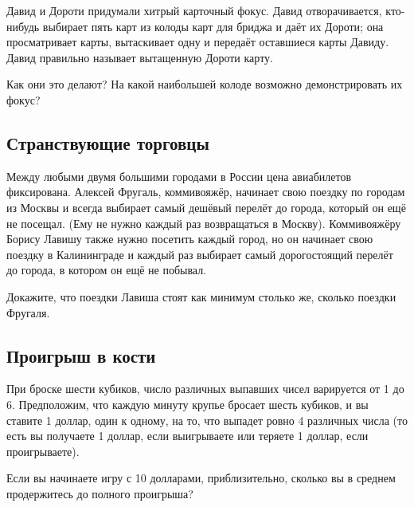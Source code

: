 Давид и Дороти придумали хитрый карточный фокус.
Давид отворачивается, кто-нибудь выбирает пять карт из колоды карт для бриджа и даёт их Дороти; она просматривает карты, вытаскивает одну и передаёт оставшиеся карты Давиду.
Давид правильно называет вытащенную Дороти карту.

Как они это делают?
На какой наибольшей колоде возможно демонстрировать их фокус?

\subsection*{Странствующие торговцы}%

Между любыми двумя большими городами в России цена авиабилетов фиксирована.
Алексей Фругаль, коммивояжёр, начинает свою поездку по городам из Москвы и всегда выбирает самый дешёвый перелёт до города, который он ещё не посещал.
(Ему не нужно каждый раз возвращаться в Москву).
Коммивояжёру Борису Лавишу также нужно посетить каждый город, но он начинает свою поездку в Калининграде и каждый раз выбирает самый дорогостоящий перелёт до города, в котором он ещё не побывал.

Докажите, что поездки Лавиша стоят как минимум столько же, сколько поездки Фругаля. %

\subsection*{Проигрыш в кости}%

При броске шести кубиков, число различных выпавших чисел варируется от 1 до 6.
Предположим, что каждую минуту крупье бросает шесть кубиков,
и вы ставите 1 доллар, один к одному, на то, что выпадет ровно 4 различных числа
(то есть вы получаете 1 доллар, если выигрываете или теряете 1 доллар, если проигрываете).

Если вы начинаете игру с 10 долларами, приблизительно, сколько вы в среднем продержитесь до полного проигрыша?
